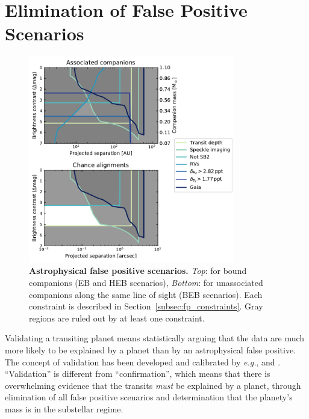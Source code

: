 \documentclass[12pt,twocolumn,tighten]{aastex63}
\begin{document}
\section{Elimination of False Positive Scenarios}
\label{sec:validation}

\begin{figure}[!t]
	\begin{center}
		\leavevmode
		\includegraphics[width=0.8\textwidth]{f4.pdf}
	\end{center}
	\vspace{-0.7cm}
	\caption{
    {\bf Astrophysical false positive scenarios.} {\it Top}: for bound
    companions (EB and HEB scenarios), {\it Bottom}: for unassociated
    companions along the same line of sight (BEB scenarios).  Each
    constraint is described in Section~\ref{subsec:fp_constraints}.
    Gray regions are ruled out by at least one constraint.
		\label{fig:fpscenario}
	}
\end{figure}

Validating a transiting planet means statistically arguing that the
data are much more likely to be explained by a planet than by an
astrophysical false positive. The concept of validation has been
developed and calibrated by {\it e.g.},
\citet{torres_modeling_2011,morton_efficient_2012,diaz_pastis_2014,santerne_pastis_2015,morton_false_2016}
and \citet{giacalone_triceratops_2020}.  ``Validation'' is different
from ``confirmation'', which means that there is overwhelming evidence
that the transits {\it must} be explained by a planet, through
elimination of all false positive scenarios and determination that the
planety's mass is in the substellar regime.
\end{document}
